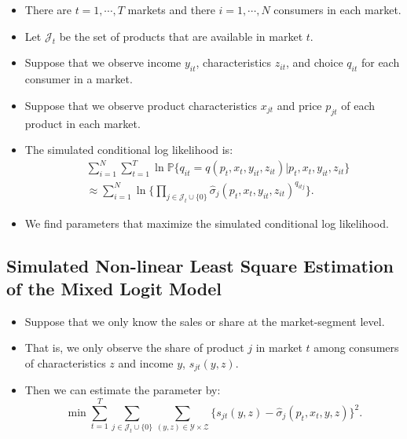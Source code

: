 \documentclass[
]{book}
\providecommand{\tightlist}{%
  \setlength{\itemsep}{0pt}\setlength{\parskip}{0pt}}
\begin{document}
\begin{itemize}
\item
  There are \(t = 1, \cdots, T\) markets and there \(i = 1, \cdots, N\) consumers in each market.
\item
  Let \(\mathcal{J}_t\) be the set of products that are available in market \(t\).
\item
  Suppose that we observe income \(y_{it}\), characteristics \(z_{it}\), and choice \(q_{it}\) for each consumer in a market.
\item
  Suppose that we observe product characteristics \(x_{jt}\) and price \(p_{jt}\) of each product in each market.
\item
  The simulated conditional log likelihood is:
  \begin{equation}
  \begin{split}
  &\sum_{i = 1}^N \sum_{t = 1}^T \ln \mathbb{P}\{q_{it} = q(p_t, x_t, y_{it}, z_{it})|p_t, x_t, y_{it}, z_{it}\} \\
  &\approx \sum_{i = 1}^N \ln \Bigg\{ \prod_{j \in \mathcal{J}_t \cup \{0\}} \hat{\sigma}_{j}(p_t, x_t, y_{it}, z_{it})^{q_{itj}} \Bigg\}.
  \end{split}
  \end{equation}
\item
  We find parameters that maximize the simulated conditional log likelihood.
\end{itemize}

\hypertarget{simulated-non-linear-least-square-estimation-of-the-mixed-logit-model}{%
\subsection{Simulated Non-linear Least Square Estimation of the Mixed Logit Model}\label{simulated-non-linear-least-square-estimation-of-the-mixed-logit-model}}

\begin{itemize}
\tightlist
\item
  Suppose that we only know the sales or share at the market-segment level.
\item
  That is, we only observe the share of product \(j\) in market \(t\) among consumers of characteristics \(z\) and income \(y\), \(s_{jt}(y, z)\).
\item
  Then we can estimate the parameter by:
  \begin{equation}
  \min \sum_{t = 1}^T \sum_{j \in \mathcal{J}_t \cup \{0\}} \sum_{(y, z) \in \mathcal{Y} \times \mathcal{Z}} \{s_{jt}(y, z) - \hat{\sigma}_{j}(p_t, x_t, y, z)\}^2.
  \end{equation}
\end{itemize}
\end{document}
